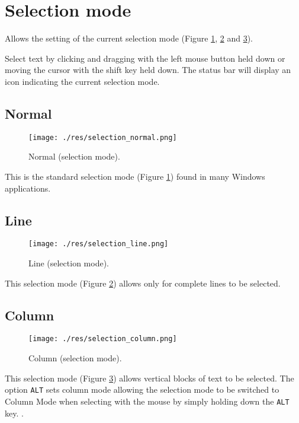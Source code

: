 
\hypertarget{working_selectionmode}{}
\section{Selection mode}

Allows the setting of the current selection mode
(Figure \ref{fig:selection_normal},
\ref{fig:selection_line} and
\ref{fig:selection_column}).

Select text by clicking and dragging with the left mouse button held
down or moving the cursor with the shift key held down. The status
bar will display an icon indicating the current selection mode.

\hypertarget{working_selectionmode_normal}{}
\subsection{Normal}

\begin{figure}[H]
  \texttt{[image: ./res/selection\_normal.png]}\\
  \caption{Normal (selection mode).}
  \label{fig:selection_normal}
\end{figure}

This is the standard selection mode
(Figure \ref{fig:selection_normal})
found in many Windows applications.

\hypertarget{working_selectionmode_line}{}
\subsection{Line}

\begin{figure}[H]
  \texttt{[image: ./res/selection\_line.png]}\\
  \caption{Line (selection mode).}
  \label{fig:selection_line}
\end{figure}

This selection mode
(Figure \ref{fig:selection_line})
allows only for complete lines to be selected.

\hypertarget{working_selectionmode_column}{}
\subsection{Column}

\begin{figure}[H]
  \texttt{[image: ./res/selection\_column.png]}\\
  \caption{Column (selection mode).}
  \label{fig:selection_column}
\end{figure}

This selection mode
(Figure \ref{fig:selection_column})
allows vertical blocks of text to be selected.
The option \texttt{ALT} sets column mode allowing the selection
mode to be switched to Column Mode when selecting with the mouse
by simply holding down the \texttt{ALT} key.
.
